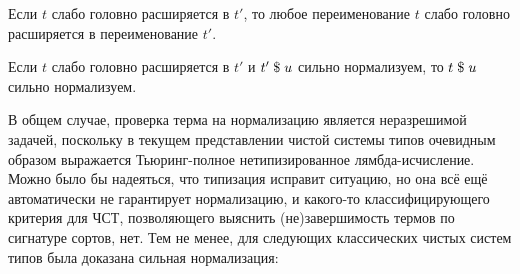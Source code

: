 \begin{lemma}
Если $t$ слабо головно расширяется в $t'$,
то любое переименование $t$ слабо головно
расширяется в переименование $t'$.
\end{lemma}

\begin{lemma}
Если $t$ слабо головно расширяется в $t'$
и $t'\;\$\;u$ сильно нормализуем, то
$t\;\$\;u$ сильно нормализуем.
\end{lemma}

В общем случае, проверка терма на нормализацию является
неразрешимой задачей, поскольку в текущем представлении
чистой системы типов очевидным образом выражается
Тьюринг-полное нетипизированное лямбда-исчисление.
Можно было бы надеяться, что типизация исправит
ситуацию, но она всё ещё автоматически не гарантирует
нормализацию, и какого-то классифицирующего критерия
для ЧСТ, позволяющего выяснить (не)завершимость термов
по сигнатуре сортов, нет. Тем не менее, для следующих
классических чистых систем типов была доказана сильная
нормализация:

